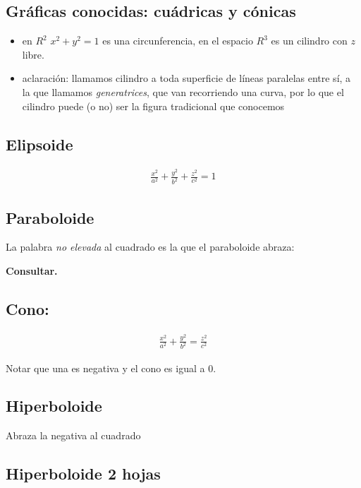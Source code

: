 \subsection{Gráficas conocidas: cuádricas y cónicas}

\begin{itemize}
    \item en \(R^{2}\) \(x^{2} + y^{2} = 1\) es una circunferencia,
    en el espacio \(R^{3}\) es un cilindro con \(z\) libre.
    \item aclaración: llamamos cilindro a toda superficie de líneas paralelas 
    entre sí, a la que llamamos \textit{generatrices}, que van recorriendo una 
    curva, por lo que el cilindro puede (o no) ser la figura tradicional que 
    conocemos
\end{itemize}

\subsection{Elipsoide}

\begin{align*}
    \frac{x^{2}}{a^{2}} + \frac{y^{2}}{b^{2}} + \frac{z^{2}}{c^{2}} = 1
\end{align*}

\subsection{Paraboloide}

La palabra \textit{no elevada} al cuadrado es la que el paraboloide abraza:

\textbf{Consultar.}

\subsection{Cono:}

\begin{align*}
    \frac{x^{2}}{a^{2}} + \frac{y^{2}}{b^{2}} = \frac{z^{2}}{c^{2}}
\end{align*}

Notar que una es negativa y el cono es igual a 0.

\subsection{Hiperboloide}

Abraza la negativa al cuadrado 

\subsection{Hiperboloide 2 hojas}

